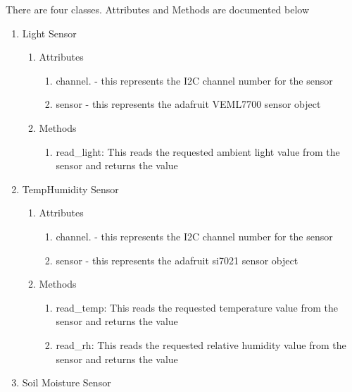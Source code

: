 \documentclass[
]{article}
\providecommand{\tightlist}{%
  \setlength{\itemsep}{0pt}\setlength{\parskip}{0pt}}
\begin{document}
There are four classes. Attributes and Methods are documented below

\begin{enumerate}
\def\labelenumi{\arabic{enumi}.}
\tightlist
\item
  Light Sensor

  \begin{enumerate}
  \def\labelenumii{\arabic{enumii}.}
  \tightlist
  \item
    Attributes

    \begin{enumerate}
    \def\labelenumiii{\arabic{enumiii}.}
    \tightlist
    \item
      channel. - this represents the I2C channel number for the sensor
    \item
      sensor - this represents the adafruit VEML7700 sensor object
    \end{enumerate}
  \item
    Methods

    \begin{enumerate}
    \def\labelenumiii{\arabic{enumiii}.}
    \tightlist
    \item
      read\_light: This reads the requested ambient light value from the
      sensor and returns the value
    \end{enumerate}
  \end{enumerate}
\item
  TempHumidity Sensor

  \begin{enumerate}
  \def\labelenumii{\arabic{enumii}.}
  \tightlist
  \item
    Attributes

    \begin{enumerate}
    \def\labelenumiii{\arabic{enumiii}.}
    \tightlist
    \item
      channel. - this represents the I2C channel number for the sensor
    \item
      sensor - this represents the adafruit si7021 sensor object
    \end{enumerate}
  \item
    Methods

    \begin{enumerate}
    \def\labelenumiii{\arabic{enumiii}.}
    \tightlist
    \item
      read\_temp: This reads the requested temperature value from the
      sensor and returns the value
    \item
      read\_rh: This reads the requested relative humidity value from
      the sensor and returns the value
    \end{enumerate}
  \end{enumerate}
\item
  Soil Moisture Sensor


\end{enumerate}
\end{document}
